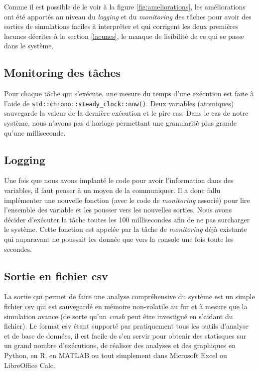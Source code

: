 \documentclass[journal]{IEEEtran}
\begin{document}
Comme il est possible de le voir à la figure \ref{fig:ameliorations}, les améliorations ont été apportés au niveau du \textit{logging} et du \textit{monitoring} des tâches pour avoir des sorties de simulations faciles à interpréter et qui corrigent les deux premières lacunes décrites à la section \ref{lacunes}, le manque de lisibilité de ce qui se passe dans le système.

\subsection{Monitoring des tâches}

Pour chaque tâche qui s'exécute, une mesure du temps d'une exécution est faite à l'aide de \verb|std::chrono::steady_clock::now()|. Deux variables (atomiques) sauvegarde la valeur de la dernière exécution et le pire cas. Dans le cas de notre système, nous n'avons pas d'horloge permettant une granularité plus grande qu'une milliseconde.

\subsection{Logging}

Une fois que nous avons implanté le code pour avoir l'information dans des variables, il faut penser à un moyen de la communiquer. Il a donc fallu implémenter une nouvelle fonction (avec le code de \textit{monitoring} associé) pour lire l'ensemble des variable et les pousser vers les nouvelles sorties. Nous avons décider d'exécuter la tâche toutes les 100 millisecondes afin de ne pas surcharger le système. Cette fonction est appelée par la tâche de \textit{monitoring} déjà existante qui auparavant ne poussait les donnée que vers la console une fois toute les secondes.

\subsection{Sortie en fichier csv}

La sortie qui permet de faire une analyse compréhensive du système est un simple fichier csv qui est sauvegardé en mémoire non-volatile au fur et à mesure que la simulation avance (de sorte qu'un \textit{crash} peut être investigué en s'aidant du fichier). Le format csv étant supporté par pratiquement tous les outils d'analyse et de base de données, il est facile de s'en servir pour obtenir des statisques sur un grand nombre d'exécutions, de réaliser des analyses et des graphiques en Python, en R, en MATLAB ou tout simplement dans Microsoft Excel ou LibreOffice Calc.
\end{document}
